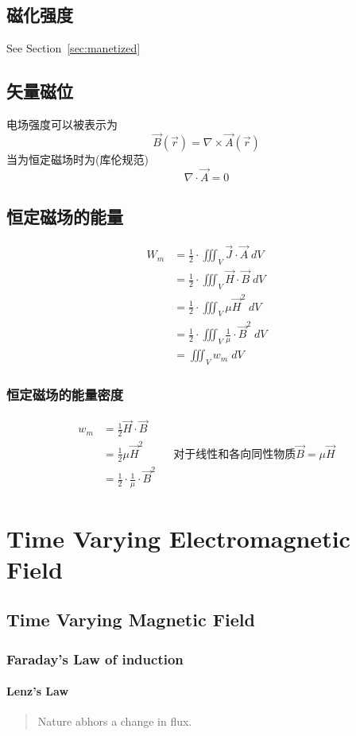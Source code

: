 \documentclass[a4paper]{report}
\begin{document}
\section{磁化强度}
See Section~\ref{sec:manetized}
\section{矢量磁位}
电场强度可以被表示为
$$\vec{B}(\vec{r})=\nabla\times \vec{A}(\vec{r}) $$
当为恒定磁场时为(库伦规范)
$$\nabla\cdot \vec{A}=0$$
\section{恒定磁场的能量}
\label{sec:energy_m}
\begin{align*}
    W_m&=\frac{1}{2}\cdot\iiint_V \vec{J}\cdot\vec{A}\; dV\\
    &=\frac{1}{2}\cdot\iiint_V \vec{H}\cdot\vec{B}\; dV\\
    &=\frac{1}{2}\cdot \iiint_V \mu \vec{H}^2 \; dV\\
    &=\frac{1}{2}\cdot \iiint_V \frac{1}{\mu}\cdot \vec{B}^2 \; dV\\
    &=\iiint_V w_m \; dV
\end{align*}

\subsection{恒定磁场的能量密度}
\begin{align*}
    w_m&=\frac{1}{2}\vec{H}\cdot\vec{B}\\
    &=\frac{1}{2}\mu\vec{H}^2 &&\text{对于线性和各向同性物质$\vec{B}=\mu\vec{H}$}\\
    &=\frac{1}{2}\cdot \frac{1}{\mu}\cdot \vec{B}^2
\end{align*}

\chapter{Time Varying Electromagnetic Field}
\section{Time Varying Magnetic Field}
\subsection{Faraday's Law of induction}
\subsubsection{Lenz's Law}
\begin{quote}
    \centering
    Nature abhors a change in flux.
\end{quote}
\end{document}
